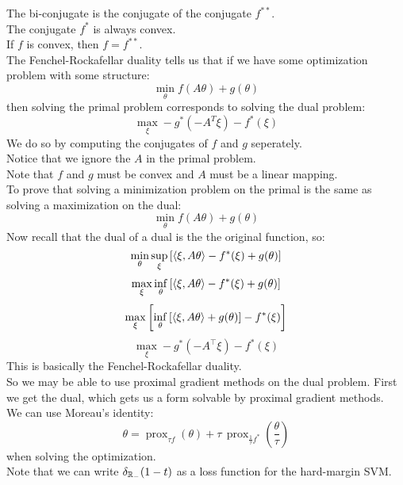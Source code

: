 \documentclass[12pt]{article}
\begin{document}
The bi-conjugate is the conjugate of the
conjugate $f^{**}$. \\

The conjugate $f^*$ is always convex. \\

If $f$ is convex, then $f = f^{**}$. \\

The Fenchel-Rockafellar duality tells
us that if we have some optimization problem
with some structure:
\[ \min_\theta f(A\theta) + g(\theta) \]
then solving the primal problem corresponds
to solving the dual problem:
\[ \max_\xi - g^*(-A^T\xi) - f^*(\xi) \]
We do so by computing the conjugates of $f$
and $g$ seperately. \\
Notice that we ignore the $A$
in the primal problem. \\
Note that $f$ and $g$ must be convex
and $A$ must be a linear mapping. \\

To prove that solving a minimization problem
on the primal is the same as solving a maximization
on the dual:
\[ \min_{\theta} f(A\theta) + g(\theta) \]
Now recall that the dual of a dual is the
the original function, so:
\[\min_{\theta} \sup_{\xi} \left[  \langle \xi, 
A\theta \rangle - f^*(\xi) + g(\theta) \right] \]
\[\max_{\xi}  \inf_{\theta}\left[  \langle \xi, 
A\theta \rangle - f^*(\xi) + g(\theta) \right] \]
\[\max_{\xi} \left[  \inf_{\theta} \left[  \langle \xi, 
A\theta \rangle + g(\theta) \right] - f^*(\xi) \right] \]
\[ \max_{\xi} - g^*(-A^\top \xi) - f^*(\xi) \]
This is basically the
Fenchel-Rockafellar duality. \\

So we may be able to use proximal gradient
methods on the dual problem.
First we get the dual, which 
gets us a form solvable by proximal gradient
methods. \\

We can use Moreau's identity:
\[ \theta = \operatorname{prox}_{\tau f}(\theta) 
+ \tau \, \operatorname{prox}_{\frac{1}{\tau} f^*}
\left(\frac{\theta}{\tau}\right) \]
when solving the optimization. \\

Note that we can write $\delta_{\mathbb{R}_-}(1-t)$
as a loss function for the hard-margin SVM. \\
\end{document}
